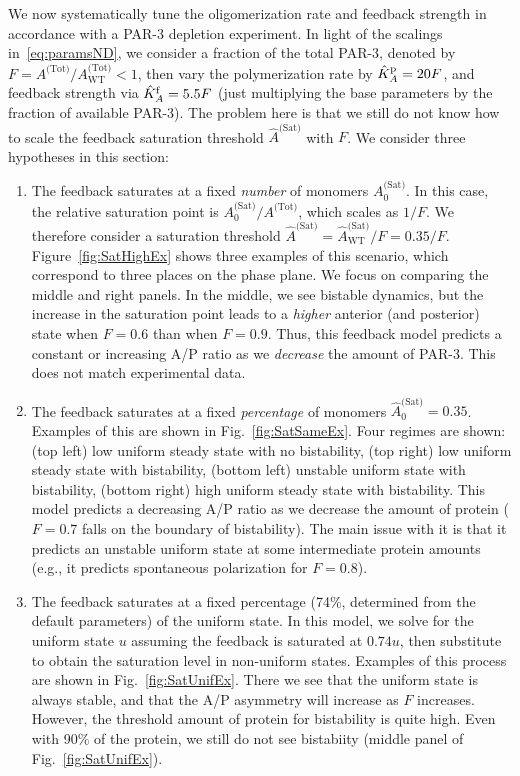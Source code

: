 \documentclass[11pt]{article}
\newcommand{\6}[1]{#1_{\text{6}}}
\newcommand{\3}[1]{#1_{\text{3}}}
\newcommand{\Tot}[1]{#1^\text{(Tot)}}
\newcommand{\Sat}[1]{#1^\text{(Sat)}}
\begin{document}
We now systematically tune the oligomerization rate and feedback strength in accordance with a PAR-3 depletion experiment. In light of the scalings in\ \eqref{eq:paramsND}, we consider a fraction of the total PAR-3, denoted by $F=\Tot{A}/\Tot{A}_\text{WT} < 1$, then vary the polymerization rate by $\hat{K}^\text{p}_A=20F$, and feedback strength via $\hat{K}^\text{f}_A=5.5F$ (just multiplying the base parameters by the fraction of available PAR-3). The problem here is that we still do not know how to scale the feedback saturation threshold $\Sat{\hat A}$ with $F$. We consider three hypotheses in this section:
\begin{enumerate}
\item The feedback saturates at a fixed \emph{number} of monomers $\Sat{A}_0$. In this case, the relative saturation point is $\Sat{A}_0/\Tot{A}$, which scales as $1/F$. We therefore consider a saturation threshold $\Sat{\hat A}=\Sat{\hat A}_\text{WT}/F=0.35/F$. Figure\ \ref{fig:SatHighEx} shows three examples of this scenario, which correspond to three places on the phase plane. We focus on comparing the middle and right panels. In the middle, we see bistable dynamics, but the increase in the saturation point leads to a \emph{higher} anterior (and posterior) state when $F=0.6$ than when $F=0.9$. Thus, this feedback model predicts a constant or increasing A/P ratio as we \emph{decrease} the amount of PAR-3. This does not match experimental data. 
\item The feedback saturates at a fixed \emph{percentage} of monomers $\Sat{\hat A}_0=0.35$. Examples of this are shown in Fig.\ \ref{fig:SatSameEx}. Four regimes are shown: (top left) low uniform steady state with no bistability, (top right) low uniform steady state with bistability, (bottom left) unstable uniform state with bistability, (bottom right) high uniform steady state with bistability. This model predicts a decreasing A/P ratio as we decrease the amount of protein ($F=0.7$ falls on the boundary of bistability). The main issue with it is that it predicts an unstable uniform state at some intermediate protein amounts (e.g., it predicts spontaneous polarization for $F=0.8$).
\item The feedback saturates at a fixed percentage (74\%, determined from the default parameters) of the uniform state. In this model, we solve for the uniform state $u$ assuming the feedback is saturated at $0.74u$, then substitute to obtain the saturation level in non-uniform states. Examples of this process are shown in Fig.\ \ref{fig:SatUnifEx}. There we see that the uniform state is always stable, and that the A/P asymmetry will increase as $F$ increases. However, the threshold amount of protein for bistability is quite high. Even with 90\% of the protein, we still do not see bistabiity (middle panel of Fig.\ \ref{fig:SatUnifEx}). 

\end{enumerate}
\end{document}
